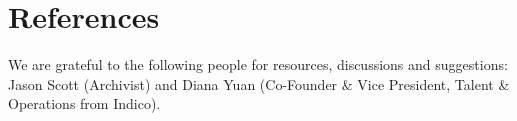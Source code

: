 \documentclass{acmtog} %
\begin{document}

\section{References}

\begin{acks}
We are grateful to the following people for resources, discussions and suggestions: Jason Scott (Archivist) and Diana Yuan (Co-Founder & Vice President, Talent & Operations from Indico).
\end{acks}




\end{document}

